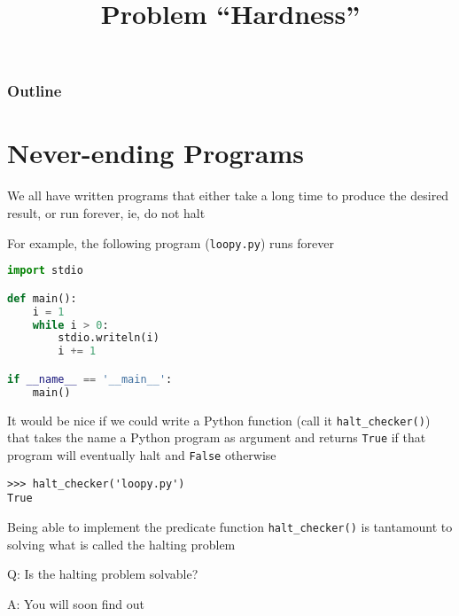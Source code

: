 \documentclass[8pt,a4paper,compress]{beamer}
\title{Problem ``Hardness''}
\date{}
\begin{document}
\begin{frame}
\vfill
\titlepage
\end{frame}

\begin{frame}
\frametitle{Outline}
\tableofcontents
\end{frame}

\section{Never-ending Programs}
\begin{frame}[fragile]
\pause

We all have written programs that either take a long time to produce the desired result, or run forever, ie, do not halt

\pause
\bigskip

For example, the following program (\lstinline{loopy.py}) runs forever

\begin{lstlisting}[language=python]
import stdio

def main():
    i = 1
    while i > 0:
        stdio.writeln(i)
        i += 1

if __name__ == '__main__':
    main()
\end{lstlisting}

\pause
\bigskip

It would be nice if we could write a Python function (call it \lstinline{halt_checker()}) that takes the name a Python program as argument and returns \lstinline{True} if that program will eventually halt and \lstinline{False} otherwise

\begin{lstlisting}[language={}]
>>> halt_checker('loopy.py')
True
\end{lstlisting}

\pause
\bigskip

Being able to implement the predicate function \lstinline{halt_checker()} is tantamount to solving what is called the halting problem

\pause
\bigskip

Q: Is the halting problem solvable?

\pause
\bigskip

A: You will soon find out
\end{frame}
\end{document}
